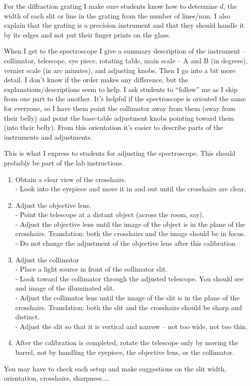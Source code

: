 For the diffraction grating I make sure students know how to determine $d$, the width of each slit or line in the grating from the number of lines/mm. I also explain that the grating is a precision instrument and that they should handle it by its edges and not put their finger prints on the glass.

When I get to the spectroscope I give a summary description of the instrument -- collimator, telescope, eye piece, rotating table, main scale -- A and B (in degrees), vernier scale (in arc minutes), and adjusting knobs. Then I go into a bit more detail. I don't know if the order makes any difference, but the explanations/descriptions seem to help. I ask students to  ``follow'' me as I skip from one part to the another. It's helpful if the spectroscope is oriented the same for everyone, so I have them point the collimator away from them (away from their belly) and point the base-table adjustment knobs pointing toward them (into their belly). From this orientation it's easier to describe parts of the instruments and adjustments.

This is what I express to students for adjusting the spectroscope. This should probably be part of the lab instructions.
\begin{enumerate}
	\item Obtain a clear view of the crosshairs.\\
- Look into  the eyepiece and move it in and out until the crosshairs are clear.

	\item Adjust the objective lens.\\
- Point the telescope at a distant object (across the room, say).\\
- Adjust the objective lens until the image of the object is in the plane of the crosshairs. Translation: both the crosshairs and the image should be in focus.\\
- Do not change the adjustment of the objective lens after this calibration

	\item Adjust the collimator\\
- Place a light source in front of the collimator slit.\\
- Look toward the collimator through the adjusted telescope. You should see and image of the illuminated slit.\\
- Adjust the collimator lens until the image of the slit is in the plane of the crosshairs. Translation: both the slit and the crosshairs should be sharp and distinct.\\
- Adjust the slit so that it is vertical and narrow -- not too wide, not too thin.

	\item After the calibration is completed, rotate the telescope only by moving the barrel, not by handling the eyepiece, the objective lens, or the collimator.
\end{enumerate}
You may have to check each setup and make suggestions on the slit width, orientation, crosshairs, sharpness....

